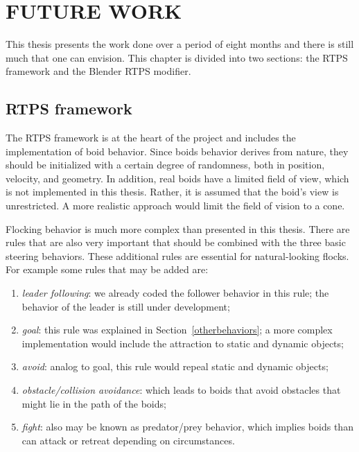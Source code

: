 \chapter{FUTURE WORK}\label{chap8}

This thesis presents the work done over a period of eight months and there is still much that one can envision. This chapter is  divided into two sections: the RTPS framework and the Blender RTPS modifier.

\section{RTPS framework}

The RTPS framework is at the heart of the project and includes the implementation of boid behavior. Since boids behavior derives from nature, they should be initialized with a certain degree of randomness, both in position, velocity, and geometry. In addition, real boids have a limited field of view, which is not implemented in this thesis. Rather, it is assumed that the boid's view is unrestricted. 
A more realistic approach would limit the field of vision to a cone.  

Flocking behavior is much more complex than presented in this thesis. There are rules that are also very important that should be combined with the three basic steering behaviors. These additional rules are essential for natural-looking flocks. For example some rules that may be added are: 

\begin{enumerate}
\item{\textit{leader following}: we already coded the follower behavior in this rule; the behavior of the leader  is still under development;}
\item{\textit{goal}: this rule was explained in Section~\ref{otherbehaviors}; a more complex implementation would include the attraction to static and dynamic objects;}
\item{\textit{avoid}: analog to goal, this rule would repeal static and dynamic objects;} 
\item{\textit{obstacle/collision avoidance}: which leads to boids that avoid obstacles that might lie in the path of the boids;}
\item{\textit{fight}: also may be known as predator/prey behavior, which implies boids than can  attack or retreat depending on circumstances.}
\end{enumerate}

